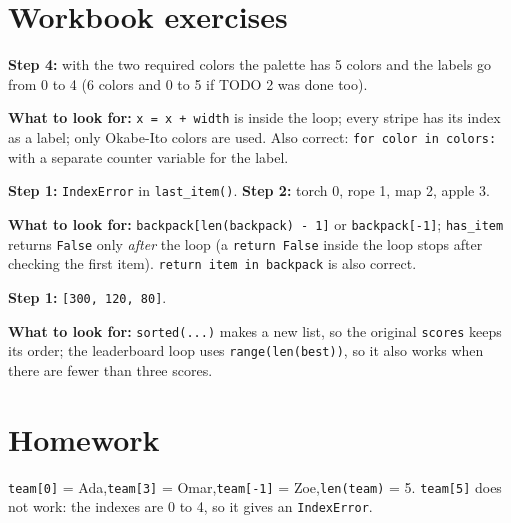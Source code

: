 
\section{Workbook exercises}
\begin{answer}
\textbf{Step 4:} with the two required colors the palette has 5 colors and the labels go from 0 to 4
(6 colors and 0 to 5 if TODO 2 was done too).\par
\textbf{What to look for:} \texttt{x = x + width} is inside the loop; every stripe has its index as a label; only Okabe-Ito colors are used.
Also correct: \texttt{for color in colors:} with a separate counter variable for the label.
\end{answer}

\begin{answer}
\textbf{Step 1:} \texttt{IndexError} in \texttt{last\_item()}.\quad
\textbf{Step 2:} torch 0, rope 1, map 2, apple 3.\par
\textbf{What to look for:} \texttt{backpack[len(backpack) - 1]} or \texttt{backpack[-1]}; \texttt{has\_item} returns \texttt{False}
only \emph{after} the loop (a \texttt{return False} inside the loop stops after checking the first item).
\texttt{return item in backpack} is also correct.
\end{answer}

\begin{answer}
\textbf{Step 1:} \texttt{[300, 120, 80]}.\par
\textbf{What to look for:} \texttt{sorted(...)} makes a new list, so the original \texttt{scores} keeps its order;
the leaderboard loop uses \texttt{range(len(best))}, so it also works when there are fewer than three scores.
\end{answer}

\section{Homework}
\begin{answer}
\texttt{team[0]} = Ada,\quad \texttt{team[3]} = Omar,\quad \texttt{team[-1]} = Zoe,\quad \texttt{len(team)} = 5.
\texttt{team[5]} does not work: the indexes are 0 to 4, so it gives an \texttt{IndexError}.
\end{answer}

